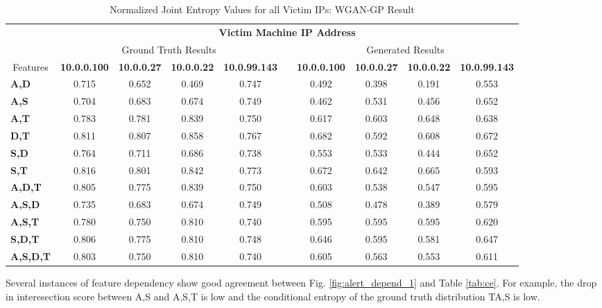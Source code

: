 \begin{table}[!htbp]
	\caption{Normalized Joint Entropy Values for all Victim IPs: WGAN-GP Result}
	\label{tab:je}
	\centering
	\begin{adjustbox}{angle=90}
		\begin{tabular}{l|c|c|c|c|c|c|c|c|c|}
			\multicolumn{1}{c|}{} & \multicolumn{9}{c|}{\textbf{Victim Machine IP Address}} \\
			\multicolumn{1}{c|}{} & \multicolumn{4}{c|}{Ground Truth Results} &  & \multicolumn{4}{c|}{Generated Results} \\
			\multicolumn{1}{c|}{Features} & \textbf{10.0.0.100} & \textbf{10.0.0.27} & \textbf{10.0.0.22} & \textbf{10.0.99.143} &  & \textbf{10.0.0.100} & \textbf{10.0.0.27} & \textbf{10.0.0.22} & \textbf{10.0.99.143} \\ \hline
			\textbf{A,D} & 0.715 & 0.652 & 0.469 & 0.747 &  & 0.492 & 0.398 & 0.191 & 0.553 \\
			\textbf{A,S} & 0.704 & 0.683 & 0.674 & 0.749 &  & 0.462 & 0.531 & 0.456 & 0.652 \\
			\textbf{A,T} & 0.783 & 0.781 & 0.839 & 0.750 &  & 0.617 & 0.603 & 0.648 & 0.638 \\
			\textbf{D,T} & 0.811 & 0.807 & 0.858 & 0.767 &  & 0.682 & 0.592 & 0.608 & 0.672 \\
			\textbf{S,D} & 0.764 & 0.711 & 0.686 & 0.738 &  & 0.553 & 0.533 & 0.444 & 0.652 \\
			\textbf{S,T} & 0.816 & 0.801 & 0.842 & 0.773 &  & 0.672 & 0.642 & 0.665 & 0.593 \\ \hline
			\textbf{A,D,T} & 0.805 & 0.775 & 0.839 & 0.750 &  & 0.603 & 0.538 & 0.547 & 0.595 \\
			\textbf{A,S,D} & 0.735 & 0.683 & 0.674 & 0.749 &  & 0.508 & 0.478 & 0.389 & 0.579 \\
			\textbf{A,S,T} & 0.780 & 0.750 & 0.810 & 0.740 &  & 0.595 & 0.595 & 0.595 & 0.620 \\
			\textbf{S,D,T} & 0.806 & 0.775 & 0.810 & 0.748 &  & 0.646 & 0.595 & 0.581 & 0.647 \\ \hline
			\textbf{A,S,D,T} & 0.803 & 0.750 & 0.810 & 0.740 &  & 0.605 & 0.563 & 0.553 & 0.611
			\end{tabular}
	\end{adjustbox}
\end{table}

Several instances of feature dependency show good agreement between Fig. \ref{fig:alert_depend_1} and Table \ref{tab:ce}. For example, the drop in interesection score between A,S and A,S,T is low and the conditional entropy of the ground truth distribution T{\given}A,S is low.

